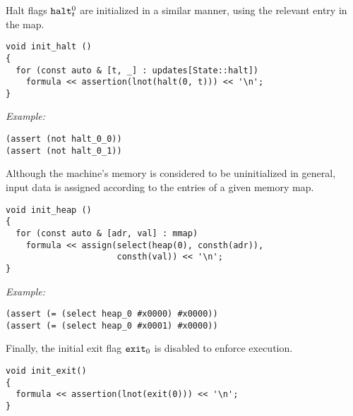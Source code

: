 
\noindent
Halt flags $\texttt{halt}^0_t$ are initialized in a similar manner, using the relevant entry in the  map.

\begin{lstlisting}[style=c++]
void init_halt ()
{
  for (const auto & [t, _] : updates[State::halt])
    formula << assertion(lnot(halt(0, t))) << '\n';
}
\end{lstlisting}

\noindent
\emph{Example:} 

\begin{lstlisting}[style=smtlib]
(assert (not halt_0_0))
(assert (not halt_0_1))
\end{lstlisting}


\noindent
Although the machine's memory is considered to be uninitialized in general, input data is assigned according to the entries of a given memory map.

\begin{lstlisting}[style=c++]
void init_heap ()
{
  for (const auto & [adr, val] : mmap)
    formula << assign(select(heap(0), consth(adr)),
                      consth(val)) << '\n';
}
\end{lstlisting}

\noindent
\emph{Example:} 

\begin{lstlisting}[style=smtlib]
(assert (= (select heap_0 #x0000) #x0000))
(assert (= (select heap_0 #x0001) #x0000))
\end{lstlisting}


\noindent
Finally, the initial exit flag $\texttt{exit}_0$ is disabled to enforce execution.

\begin{lstlisting}[style=c++]
void init_exit()
{
  formula << assertion(lnot(exit(0))) << '\n';
}
\end{lstlisting}

